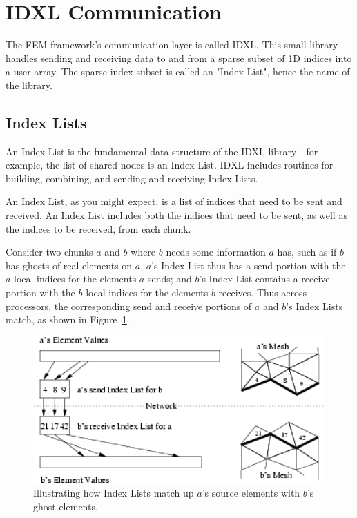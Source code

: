 \section{IDXL Communication}

The FEM framework's communication layer is called IDXL. This small library handles sending and receiving data to and from a sparse subset of 1D indices into a user array.  The sparse index subset is called an "Index List", hence the name of the library.


\subsection{Index Lists}
\label{sec:IDXL}
An Index List is the fundamental data structure of the IDXL library---for example, the list of shared nodes is an Index List.  IDXL includes routines for building, combining, and sending and receiving Index Lists.

An Index List, as you might expect, is a list of indices that need to be sent and received.  An Index List includes both the indices that need to be sent, as well as the indices to be received, from each chunk.

Consider two chunks $a$ and $b$ where $b$ needs some information $a$ has, such as if $b$ has ghosts of real elements on $a$.  $a$'s Index List thus has a send portion with the $a$-local indices for the elements $a$ sends; and $b$'s Index List contains a receive portion with the $b$-local indices for the elements $b$ receives.  Thus across processors, the corresponding send and receive portions of $a$ and $b$'s Index Lists match, as shown in Figure~\ref{fig:indexlists}.


\begin{figure}[h]
\begin{center}
\includegraphics[width=5in]{fig/indexlists}
\end{center}
\caption{Illustrating how Index Lists match up $a$'s source elements with $b$'s ghost elements.}
\label{fig:indexlists}
\end{figure}



